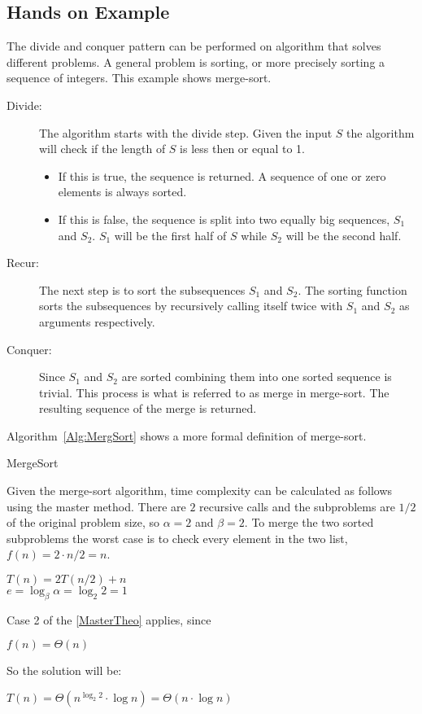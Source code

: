 \subsection{Hands on Example}
The divide and conquer pattern can be performed on algorithm that solves
different problems. A general problem is sorting, or more precisely sorting a
sequence of integers. This example shows merge-sort.

\begin{description}
\item[Divide:] The algorithm starts with the divide step. Given the input $S$
the algorithm will check if the length of $S$ is less then or equal to 1.
\begin{itemize}
\item If this is true, the sequence is returned. A sequence of one or zero
elements is always sorted.
\item If this is false, the sequence is split into two equally big sequences,
$S_1$ and $S_2$. $S_1$ will be the first half of $S$ while $S_2$ will be the
second half.
\end{itemize}
\item[Recur:] The next step is to sort the subsequences $S_1$ and $S_2$. The
sorting function sorts the subsequences by recursively calling itself twice with
$S_1$ and $S_2$ as arguments respectively.
\item[Conquer:] Since $S_1$ and $S_2$ are sorted combining them into one sorted
sequence is trivial. This process is what is referred to as merge in merge-sort.
The resulting sequence of the merge is returned.
\end{description}
Algorithm~\ref{Alg:MergSort} shows a more formal definition of merge-sort.

\begin{algorithm}
\DontPrintSemicolon
{}
\caption{MergeSort}
\label{Alg:MergSort}
\end{algorithm}

Given the merge-sort algorithm, time complexity can be calculated as follows
using the master method. There are $2$ recursive calls and the subproblems are
$1/2$ of the original problem size, so $\alpha=2$ and $\beta=2$. To merge the
two sorted subproblems the worst case is to check every element in the two list,
$f(n) = 2 \cdot n/2 = n$.
\begin{center}
$T(n) = 2T(n/2) + n$\\
$e=\log_\beta\alpha=\log_2 2=1$
\end{center}
Case 2 of the \cref{MasterTheo} applies, since
\begin{center}
$f(n) = \Theta(n)$
\end{center}
So the solution will be:
\begin{center}
$T(n) = \Theta(n^{\log_2 2} \cdot \log n) = \Theta(n \cdot \log n)$
\end{center}

